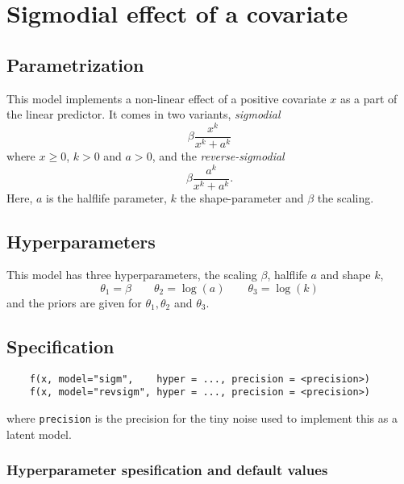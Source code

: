 \documentclass[a4paper,11pt]{article}
\begin{document}
\section*{Sigmodial effect of a covariate}

\subsection*{Parametrization}

This model implements a non-linear effect of a positive covariate $x$
as a part of the linear predictor. It comes in two variants,
\emph{sigmodial}
\begin{displaymath}
    \beta \frac{x^{k}}{x^{k} + a^{k}}
\end{displaymath}
where $x\ge 0$, $k>0$ and $a>0$, and the \emph{reverse-sigmodial}
\begin{displaymath}
    \beta \frac{a^{k}}{x^{k} + a^{k}}.
\end{displaymath}
Here, $a$ is the halflife parameter, $k$ the shape-parameter and
$\beta$ the scaling.

\subsection*{Hyperparameters}

This model has three hyperparameters, the scaling $\beta$, halflife
$a$ and shape $k$,
\begin{displaymath}
    \theta_1 = \beta \qquad \theta_2 = \log(a) \qquad  \theta_3 = \log(k)
\end{displaymath}
and the priors are given for $\theta_1, \theta_2$ and $\theta_3$.


\subsection*{Specification}

\begin{verbatim}
    f(x, model="sigm",    hyper = ..., precision = <precision>)
    f(x, model="revsigm", hyper = ..., precision = <precision>)
\end{verbatim}
where \texttt{precision} is the precision for the tiny noise used to
implement this as a latent model. 

\subsubsection*{Hyperparameter spesification and default values}

\end{document}
